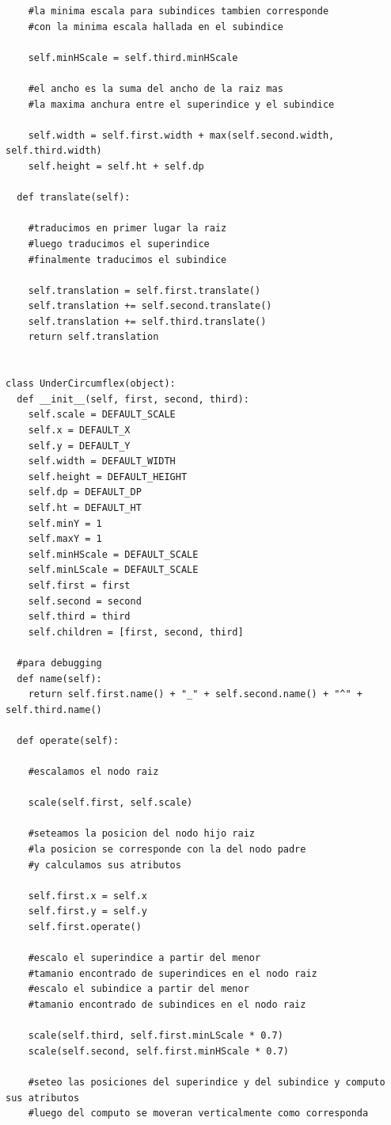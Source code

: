 \begin{verbatim}
    #la minima escala para subindices tambien corresponde 
    #con la minima escala hallada en el subindice
    
    self.minHScale = self.third.minHScale
    
    #el ancho es la suma del ancho de la raiz mas 
    #la maxima anchura entre el superindice y el subindice
    
    self.width = self.first.width + max(self.second.width, self.third.width)
    self.height = self.ht + self.dp

  def translate(self):

    #traducimos en primer lugar la raiz
    #luego traducimos el superindice
    #finalmente traducimos el subindice
    
    self.translation = self.first.translate()
    self.translation += self.second.translate()
    self.translation += self.third.translate()
    return self.translation


class UnderCircumflex(object):
  def __init__(self, first, second, third):
    self.scale = DEFAULT_SCALE
    self.x = DEFAULT_X
    self.y = DEFAULT_Y
    self.width = DEFAULT_WIDTH
    self.height = DEFAULT_HEIGHT
    self.dp = DEFAULT_DP
    self.ht = DEFAULT_HT
    self.minY = 1
    self.maxY = 1
    self.minHScale = DEFAULT_SCALE
    self.minLScale = DEFAULT_SCALE
    self.first = first
    self.second = second
    self.third = third
    self.children = [first, second, third]

  #para debugging
  def name(self):
    return self.first.name() + "_" + self.second.name() + "^" + self.third.name()

  def operate(self):

    #escalamos el nodo raiz
    
    scale(self.first, self.scale)

    #seteamos la posicion del nodo hijo raiz
    #la posicion se corresponde con la del nodo padre
    #y calculamos sus atributos
    
    self.first.x = self.x
    self.first.y = self.y
    self.first.operate()

    #escalo el superindice a partir del menor 
    #tamanio encontrado de superindices en el nodo raiz
    #escalo el subindice a partir del menor 
    #tamanio encontrado de subindices en el nodo raiz

    scale(self.third, self.first.minLScale * 0.7)
    scale(self.second, self.first.minHScale * 0.7)

    #seteo las posiciones del superindice y del subindice y computo sus atributos
    #luego del computo se moveran verticalmente como corresponda


\end{verbatim}
